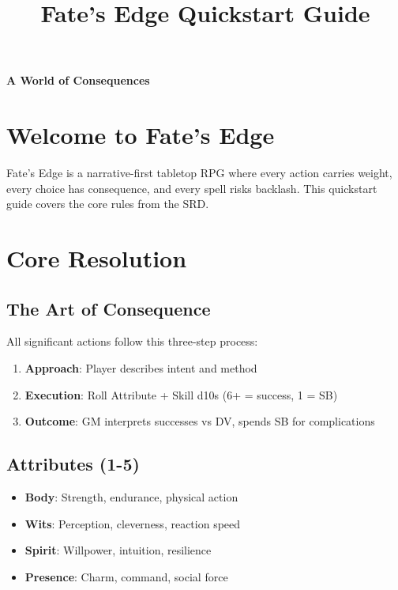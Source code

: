 \documentclass[11pt]{article}
\title{Fate's Edge Quickstart Guide}
\author{}
\date{}
\begin{document}
\maketitle

\begin{center}
\textbf{A World of Consequences}
\end{center}

\section{Welcome to Fate's Edge}

Fate's Edge is a narrative-first tabletop RPG where every action carries weight, every choice has consequence, and every spell risks backlash. This quickstart guide covers the core rules from the SRD.

\section{Core Resolution}

\subsection{The Art of Consequence}
All significant actions follow this three-step process:
\begin{enumerate}
    \item \textbf{Approach}: Player describes intent and method
    \item \textbf{Execution}: Roll Attribute + Skill d10s (6+ = success, 1 = SB)
    \item \textbf{Outcome}: GM interprets successes vs DV, spends SB for complications
\end{enumerate}

\subsection{Attributes (1-5)}
\begin{itemize}
    \item \textbf{Body}: Strength, endurance, physical action
    \item \textbf{Wits}: Perception, cleverness, reaction speed  
    \item \textbf{Spirit}: Willpower, intuition, resilience
    \item \textbf{Presence}: Charm, command, social force
\end{itemize}
\end{document}
